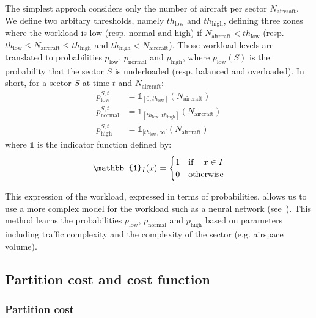 \documentclass[oneside,twocolumn]{article}
\begin{document}
The simplest approch considers only the number of aircraft per sector $N_\text{aircraft}$. We
define two arbitary thresholds, namely $th_\text{low}$ and $th_\text{high}$, defining
three zones where the workload is low (resp. normal and high) if $N_\text{aircraft} < th_\text{low}$
(resp. $th_\text{low} \leq N_\text{aircraft} \leq th_\text{high}$ and $th_\text{high} < N_\text{aircraft}$).
Those workload levels are translated to probabilities $p_\text{low}$, $p_\text{normal}$ and
$p_\text{high}$, where $p_\text{low}(S)$ is the probability that the sector $S$ is underloaded
(resp. balanced and overloaded). In short, for a sector $S$ at time $t$ and $N_\text{aircraft}$:
\begin{equation}
  \begin{aligned}
    p_\text{low}^{S, t} &= \mathbb{1}_{[0, th_\text{low}]}(N_\text{aircraft}) \\
    p_\text{normal}^{S, t} &= \mathbb{1}_{[th_\text{low}, th_\text{high}]}(N_\text{aircraft})\\
    p_\text{high}^{S, t} &= \mathbb{1}_{[th_\text{low}, \infty[}(N_\text{aircraft})
  \end{aligned}
\end{equation}
where $\mathbb{1}$ is the indicator function defined by:
\begin{equation}
  \mathbb{1}_{I}(x) =
  \begin{cases}
    1 & \text{if\,} \quad x \in I\\
    0 & \text{otherwise}
  \end{cases}
\end{equation}

This expression of the workload, expressed in terms of probabilities, allows us to
use a more complex model for the workload such as a neural network
(see~\cite{gianazza2010forecasting}). This method learns the probabilities $p_\text{low}$,
$p_\text{normal}$ and $p_\text{high}$ based on parameters including traffic complexity and
the complexity of the sector (e.g. airspace volume).

\subsection{Partition cost and cost function}

\subsubsection{Partition cost}
\end{document}
